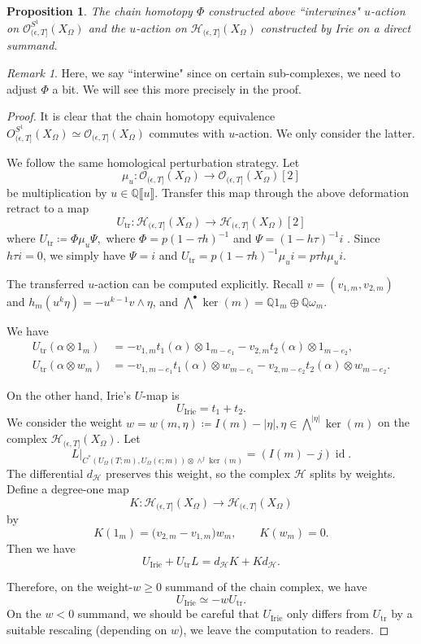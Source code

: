 \documentclass[11pt]{amsart}
\numberwithin{equation}{section}
\theoremstyle{plain}
\newtheorem{Prop}[prop]{Proposition}
\theoremstyle{definition}
\theoremstyle{remark}
\newtheorem{RMK}[rmk]{Remark}
\newcommand{\bQ} { {\mathbb{Q}}}
\newcommand{\id}{{\operatorname{id}}}
\newcommand{\fpw}[1]{{\llbracket #1\rrbracket}}
\begin{document}
\begin{Prop}The chain homotopy $\Phi$ constructed above ``interwines" $u$-action on $\mathcal{O}_{(\epsilon,T]}^{S^1}(X_\Omega)$ and the $u$-action on $\mathcal{H}_{(\epsilon,T]}(X_\Omega)$ constructed by Irie on a direct summand. 
\end{Prop}
\begin{RMK}Here, we say ``interwine" since on certain sub-complexes, we need to adjust $\Phi$ a bit. We will see this more precisely in the proof.    
\end{RMK}
\begin{proof}It is clear that the chain homotopy equivalence $O_{(\epsilon,T]}^{S^1}(X_\Omega)\simeq \mathcal{O}_{(\epsilon,T]}(X_\Omega)$ commutes with $u$-action. We only consider the latter.

We follow the same homological perturbation strategy. Let
\[
\mu_u:
\mathcal{O}_{(\epsilon,T]}(X_\Omega)
\longrightarrow
\mathcal{O}_{(\epsilon,T]}(X_\Omega)[2]
\]
be multiplication by $u\in \bQ\fpw{u}$. Transfer this map through the above deformation
retract to a map 
\[U_{\mathrm{tr}}: \mathcal{H}_{(\epsilon,T]}(X_\Omega)
\longrightarrow
\mathcal{H}_{(\epsilon,T]}(X_\Omega)[2]
\]
where $
U_{\mathrm{tr}}
\coloneqq 
\Phi\mu_u\Psi,
$
where 
$\Phi = p(1-\tau h)^{-1}$
and
$
\Psi=(1-h\tau )^{-1}i
$
\cite{Homological-perturbation}. Since $h\tau i=0$, we simply have $\Psi=i$ and $U_{\mathrm{tr}} = p(1-\tau h)^{-1}\mu_ui = p\tau h \mu_u i$.

The transferred $u$-action can be computed explicitly. Recall $v = (v_{1,m} ,v_{2,m})$ and $h_m(u^k\eta) = -u^{k-1}v \wedge \eta$, and $\bigwedge^\bullet \ker(m)=\bQ 1_m\oplus \bQ \omega_m$.

We have
\begin{align*}
    U_{\mathrm{tr}}(\alpha\otimes 1_m)
&=-
v_{1,m}t_1(\alpha)\otimes 1_{m-e_1}
-v_{2,m}t_2(\alpha)\otimes 1_{m-e_2},\\
U_{\mathrm{tr}}(\alpha\otimes w_m)
&=
-v_{1,m-e_1}t_1(\alpha)\otimes w_{m-e_1} 
-v_{2,m-e_2}t_2(\alpha)\otimes w_{m-e_2} .
\end{align*}

On the other hand, Irie's $U$-map is \cite[Proof of Proposition 3.1]{Irie_ChainModel}
\[
U_{\mathrm{Irie}}
=
t_1+t_2.
\]
We consider the weight $
w=w(m,\eta)
\coloneqq 
I(m)-|\eta|,
\eta\in\bigwedge^{|\eta|}\ker(m)$ on the complex $\mathcal{H}_{(\epsilon,T]}(X_\Omega)$.
Let\[
L|_{C^*(U_\Omega(T;m),U_\Omega(\epsilon;m))\otimes\wedge^j\ker(m)}
=
(I(m)-j)\id.
\]
The differential $d_{\mathcal{H}}$ preserves this weight, so the complex $\mathcal{H}$ splits by weights.
Define a degree-one map \[
K:\mathcal{H}_{(\epsilon,T]}(X_\Omega)
\longrightarrow
\mathcal{H}_{(\epsilon,T]}(X_\Omega)
\]
by
\[
K(1_m)
=
\bigl(
v_{2,m}-v_{1,m}
\bigr)w_m,
\qquad
K(w_m)=0.
\]
Then we have
\[
U_{\mathrm{Irie}}
+
U_{\mathrm{tr}}L
=
d_{\mathcal{H}}K+Kd_{\mathcal{H}}.
\]

Therefore, on the weight-$w\geq 0$ summand of the chain complex, we have
\[
U_{\mathrm{Irie}}
\simeq
-w U_{\mathrm{tr}}.
\]
On the $w< 0$ summand, we should be careful that $U_{\mathrm{Irie}}$ only differs from $U_{\mathrm{tr}}$ by a suitable rescaling (depending on $w$), we leave the computation to readers.
\end{proof}
\end{document}
